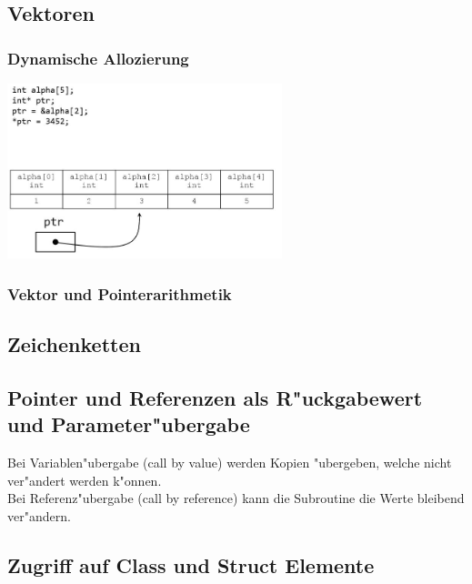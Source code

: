   \subsection{Vektoren}
  	
  \subsubsection{Dynamische Allozierung}
  \begin{minipage}[t]{10.5 cm}
    
  \end{minipage}
  \begin{minipage}[t]{10.5 cm}
    \includegraphics[width=0.6\textwidth]{pics/ptrAndVec.jpg}
    \end{minipage}
      \subsubsection{Vektor und Pointerarithmetik}
       
    
  \subsection{Zeichenketten}
   
  \subsection{Pointer und Referenzen als R"uckgabewert und Parameter"ubergabe}
  Bei Variablen"ubergabe (call by value) werden Kopien "ubergeben, welche nicht ver"andert werden k"onnen.\\
  Bei Referenz"ubergabe (call by reference) kann die Subroutine die Werte bleibend ver"andern.
  \begin{minipage}[t]{7 cm}
    
   \end{minipage}
    \begin{minipage}[t]{10.5 cm}
       
      \end{minipage}
    
  \subsection{Zugriff auf Class und Struct Elemente}
   
